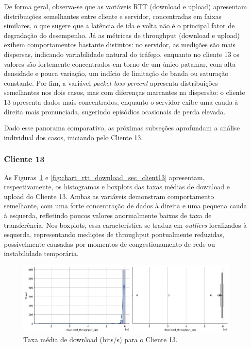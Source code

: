 \documentclass{article}
\begin{document}
De forma geral, observa-se que as variáveis RTT (download e upload) apresentam distribuições semelhantes entre cliente e servidor, concentradas em faixas similares, o que sugere que a latência de ida e volta não é o principal fator de degradação do desempenho.  
Já as métricas de throughput (download e upload) exibem comportamentos bastante distintos: no servidor, as medições são mais dispersas, indicando variabilidade natural do tráfego, enquanto no cliente 13 os valores são fortemente concentrados em torno de um único patamar, com alta densidade e pouca variação, um indício de limitação de banda ou saturação constante.  
Por fim, a variável \textit{packet loss percent} apresenta distribuições semelhantes nos dois casos, mas com diferenças marcantes na dispersão: o cliente 13 apresenta dados mais concentrados, enquanto o servidor exibe uma cauda à direita mais pronunciada, sugerindo episódios ocasionais de perda elevada.

Dado esse panorama comparativo, as próximas subseções aprofundam a análise individual dos casos, iniciando pelo Cliente 13.

\subsubsection{Cliente 13}

As Figuras~\ref{fig:chart_download_throughput_bps_client13} e \ref{fig:chart_rtt_download_sec_client13} apresentam, respectivamente, os histogramas e boxplots das taxas médias de download e upload do Cliente 13.  
Ambas as variáveis demonstram comportamento semelhante, com uma forte concentração de dados à direita e uma pequena cauda à esquerda, refletindo poucos valores anormalmente baixos de taxa de transferência.  
Nos boxplots, essa característica se traduz em \textit{outliers} localizados à esquerda, representando medições de throughput pontualmente reduzidas, possivelmente causadas por momentos de congestionamento de rede ou instabilidade temporária.

\begin{figure}[htp]
	\includegraphics[width=\textwidth]{../figures/eda/chart_download_throughput_bps_client13.png}
	\caption{Taxa média de download (bits/s) para o Cliente 13.}
	\label{fig:chart_download_throughput_bps_client13}
\end{figure}
\end{document}
